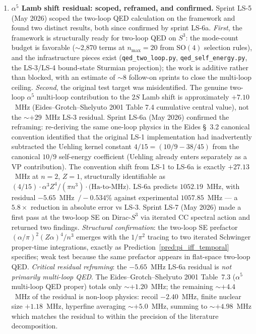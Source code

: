 \documentclass[11pt]{article}
\begin{document}
\begin{enumerate}
\item \textbf{$\alpha^5$ Lamb shift residual: scoped, reframed, and
confirmed.}  Sprint LS-5 (May 2026) scoped the two-loop QED
calculation on the framework and found two distinct results, both
since confirmed by sprint LS-6a.  \emph{First}, the framework is
structurally ready for two-loop QED on $S^3$: the mode-count budget
is favorable ($\sim$2,870 terms at $n_\text{max}=20$ from
$\mathrm{SO}(4)$ selection rules), and the infrastructure pieces
exist (\texttt{qed\_two\_loop.py}, \texttt{qed\_self\_energy.py}, the
LS-3/LS-4 bound-state Sturmian projection); the work is additive
rather than blocked, with an estimate of $\sim$8 follow-on sprints
to close the multi-loop ceiling.  \emph{Second}, the original test
target was misidentified.  The genuine two-loop $\alpha^5$ multi-loop
contribution to the 2$S$ Lamb shift is approximately $+7.10$~MHz
(Eides--Grotch--Shelyuto 2001 Table 7.4 cumulative central value),
not the $\sim +29$~MHz LS-3 residual.  Sprint LS-6a (May 2026)
confirmed the reframing: re-deriving the same one-loop physics in the
Eides \S~3.2 canonical convention identified that the original LS-1
implementation had inadvertently subtracted the Uehling kernel
constant $4/15 = (10/9 - 38/45)$ from the canonical $10/9$
self-energy coefficient (Uehling already enters separately as a VP
contribution).  The convention shift from LS-1 to LS-6a is exactly
$+27.13$~MHz at $n=2$, $Z=1$, structurally identifiable as $(4/15)
\cdot \alpha^3 Z^4 / (\pi n^3) \cdot \text{(Ha-to-MHz)}$.  LS-6a
predicts $1052.19$~MHz, with residual $-5.65$~MHz~$/-0.534\%$
against experimental $1057.85$~MHz --- a $5.8\times$ reduction in
absolute error vs LS-3.  Sprint LS-7 (May 2026) made a first pass at
the two-loop SE on Dirac-$S^3$ via iterated CC spectral action and
returned two findings.  \emph{Structural confirmation}: the two-loop
SE prefactor $(\alpha/\pi)^2 (Z\alpha)^4 / n^3$ emerges with the
$1/\pi^2$ tracing to two iterated Schwinger proper-time integrations,
exactly as Prediction~\ref{pred:pi_iff_temporal} specifies; weak test
because the same prefactor appears in flat-space two-loop QED.
\emph{Critical residual reframing}: the $-5.65$~MHz LS-6a residual
is \emph{not primarily multi-loop QED}.  The
Eides--Grotch--Shelyuto 2001 Table~7.3 ($\alpha^5$ multi-loop QED
proper) totals only $\sim +1.20$~MHz; the remaining
$\sim +4.4$~MHz of the residual is non-loop physics: recoil
$-2.40$~MHz, finite nuclear size $+1.18$~MHz, hyperfine averaging
$\sim +5.0$~MHz, summing to $\sim +4.98$~MHz which matches the
residual to within the precision of the literature decomposition.

\end{enumerate}
\end{document}
